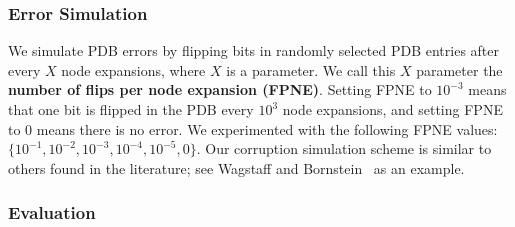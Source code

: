 \documentclass[letterpaper]{article}
\begin{document}

\subsubsection{Error Simulation}


We simulate PDB errors by flipping bits in randomly selected PDB entries after every $X$ node expansions, where $X$ is a parameter. We call this $X$ parameter the \textbf{number of flips per node expansion (FPNE)}. Setting FPNE to $10^{-3}$ means that one bit is flipped in the PDB every $10^{3}$ node expansions, and setting FPNE to $0$ means there is no error. We experimented with the following FPNE values: $\{10^{-1},10^{-2}, 10^{-3}, 10^{-4}, 10^{-5}, 0\}$. Our corruption simulation scheme is similar to others found in the literature; see Wagstaff and Bornstein~ as an example. 




\subsubsection{Evaluation}
\end{document}
